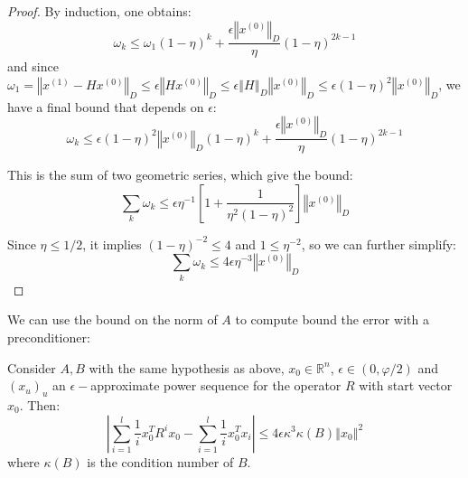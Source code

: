 \begin{proof}
By induction, one obtains: 
\[
\omega_{k}\leq\omega_{1}\left(1-\eta\right)^{k}+\frac{\epsilon\left\Vert x^{\left(0\right)}\right\Vert _{D}}{\eta}\left(1-\eta\right)^{2k-1}
\]
and since $\omega_{1}=\left\Vert x^{\left(1\right)}-Hx^{\left(0\right)}\right\Vert _{D}\leq\epsilon\left\Vert Hx^{\left(0\right)}\right\Vert _{D}\leq\epsilon\left\Vert H\right\Vert _{D}\left\Vert x^{\left(0\right)}\right\Vert _{D}\leq\epsilon\left(1-\eta\right)^{2}\left\Vert x^{\left(0\right)}\right\Vert _{D}$,
we have a final bound that depends on $\epsilon$: 
\[
\omega_{k}\leq\epsilon\left(1-\eta\right)^{2}\left\Vert x^{\left(0\right)}\right\Vert _{D}\left(1-\eta\right)^{k}+\frac{\epsilon\left\Vert x^{\left(0\right)}\right\Vert _{D}}{\eta}\left(1-\eta\right)^{2k-1}
\]


This is the sum of two geometric series, which give the bound: 
\[
\sum_{k}\omega_{k}\leq\epsilon\eta^{-1}\left[1+\frac{1}{\eta^{2}\left(1-\eta\right)^{2}}\right]\left\Vert x^{\left(0\right)}\right\Vert _{D}
\]


Since $\eta\leq1/2$, it implies $\left(1-\eta\right)^{-2}\leq4$
and $1\leq\eta^{-2}$, so we can further simplify: 
\[
\sum_{k}\omega_{k}\leq4\epsilon\eta^{-3}\left\Vert x^{\left(0\right)}\right\Vert _{D}
\]


\end{proof}

We can use the bound on the norm of $A$ to compute bound the error
with a preconditioner:

\begin{lemma}\label{lem:partial-sequence-approximate}Consider $A,B$
with the same hypothesis as above, $x_{0}\in\mathbb{R}^{n}$, $\epsilon\in\left(0,\varphi/2\right)$
and $\left(x_{u}\right)_{u}$ an $\epsilon-$approximate power sequence
for the operator $R$ with start vector $x_{0}$. Then:
\[
\left|\sum_{i=1}^{l}\frac{1}{i}x_{0}^{T}R^{i}x_{0}-\sum_{i=1}^{l}\frac{1}{i}x_{0}^{T}x_{i}\right|\leq4\epsilon\kappa^{3}\kappa\left(B\right)\left\Vert x_{0}\right\Vert ^{2}
\]
 where $\kappa\left(B\right)$ is the condition number of $B$.

\end{lemma}

